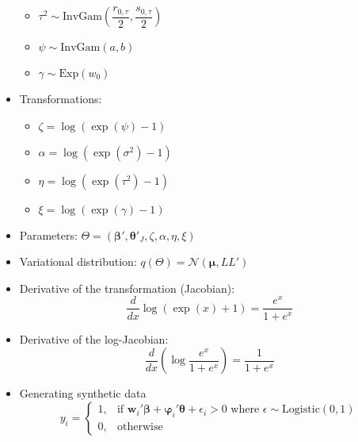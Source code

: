 \documentclass[review]{elsarticle}
\begin{document}
\begin{itemize}
\begin{itemize}
    \item $\tau^{2} \sim \mathrm{InvGam}\left(\dfrac{r_{0,\tau}}{2},\dfrac{s_{0,\tau}}{2}\right)$
    \item $\psi \sim \mathrm{InvGam}(a,b)$
    \item $\gamma\sim\mathrm{Exp}\left(w_{0}\right)$
  \end{itemize}
  \item Transformations:
  \begin{itemize}
    \item $\zeta = \log(\exp(\psi)-1)$
    \item $\alpha=\log(\exp(\sigma^{2})-1)$
    \item $\eta = \log(\exp(\tau^{2})-1)$
    \item $\xi = \log(\exp(\gamma)-1)$
  \end{itemize}
  \item Parameters: $\Theta = \left(\bm{\beta}',\bm{\theta}'_{J},\zeta,\alpha,\eta,\xi\right)$
  \item Variational distribution: $q(\Theta)=\mathcal{N}(\bm{\mu},LL')$
  \item Derivative of the transformation (Jacobian):
  \begin{equation}
    \dfrac{d}{dx}\log(\exp(x)+1) = \dfrac{e^{x}}{1+e^{x}}
  \end{equation}
  \item Derivative of the log-Jacobian:
  \begin{equation}
  \dfrac{d}{dx}\left(\log\dfrac{e^{x}}{1+e^{x}}\right)=\dfrac{1}{1+e^{x}}
  \end{equation}
  \item Generating synthetic data
  \begin{equation}
    y_{i} = \begin{cases}1, & \text{if $\mathbf{w}_{i}'\bm{\beta}+\bm{\varphi}_{i}'\bm{\theta}+\epsilon_{i} > 0$ where $\epsilon\sim\mathrm{Logistic}(0,1)$}\\ 0, & \text{otherwise}\end{cases}
  \end{equation}
\end{itemize}
\end{document}
